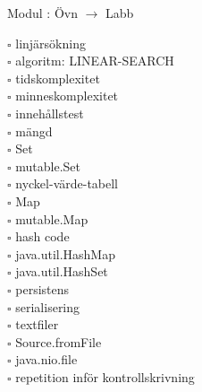 
    Modul : Övn  $\rightarrow$ Labb 
    \begin{multicols}{3}\SlideFontTiny
    $\square$ linjärsökning \\
$\square$ algoritm: LINEAR-SEARCH \\
$\square$ tidskomplexitet \\
$\square$ minneskomplexitet \\
$\square$ innehållstest \\
$\square$ mängd \\
$\square$ Set \\
$\square$ mutable.Set \\
$\square$ nyckel-värde-tabell \\
$\square$ Map \\
$\square$ mutable.Map \\
$\square$ hash code \\
$\square$ java.util.HashMap \\
$\square$ java.util.HashSet \\
$\square$ persistens \\
$\square$ serialisering \\
$\square$ textfiler \\
$\square$ Source.fromFile \\
$\square$ java.nio.file \\
$\square$ repetition inför kontrollskrivning \\
    \end{multicols}
    